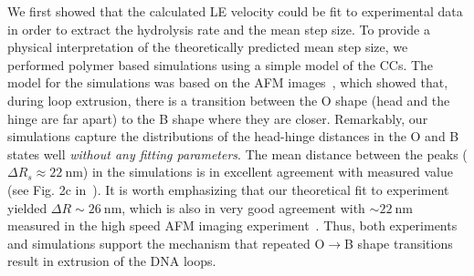 \documentclass[fleqn,10pt]{wlscirep}
\newcommand{\pN}{\ \mathrm{pN}}
\newcommand{\nm}{\ \mathrm{nm}}
\begin{document}
We first showed that the calculated LE velocity could be fit to experimental data in order to extract the hydrolysis rate and the mean step size. To provide a physical interpretation of the theoretically predicted mean step size, we performed polymer based simulations using a simple model of the CCs. The model for the simulations was based on the AFM images~\cite{ryu2020condensin}, which  showed that, during loop extrusion, there is a transition between the O shape (head and the hinge are far apart) to the B shape where they are closer. Remarkably, our simulations capture the distributions of the head-hinge distances in the O and B states well {\it without any fitting parameters}. The  mean distance between the peaks ($\Delta R_s \approx 22\nm$) in the simulations is in excellent agreement with measured value (see Fig. 2c in~\cite{ryu2020condensin}).  It is worth emphasizing that our theoretical fit to experiment yielded  $\Delta R \sim 26 \nm$, which is also in very good agreement with $\sim22\nm$ measured in the high speed AFM imaging experiment~\cite{ryu2020condensin}. Thus, both experiments and simulations support the mechanism that repeated O$\rightarrow$B shape transitions result in extrusion of the DNA loops. 
\end{document}
